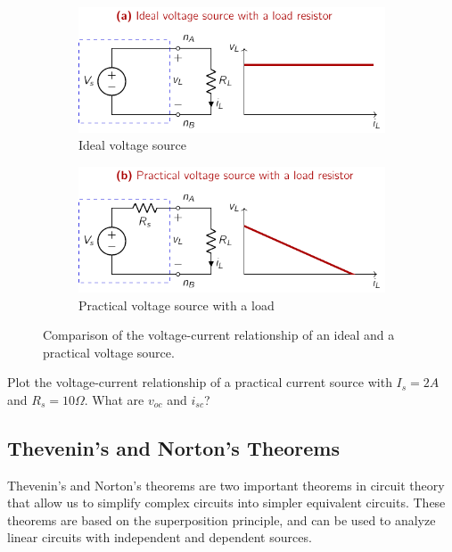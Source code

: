 \begin{figure}[t]
    \centering
    \begin{subfigure}{0.48\textwidth}
        \centering
        \includegraphics[width=\textwidth]{figure/fig02-04a.pdf}
        \caption{Ideal voltage source}
        \label{fig:02-04a}
    \end{subfigure}
    \hfill
    \begin{subfigure}{0.48\textwidth}
        \centering
        \includegraphics[width=\textwidth]{figure/fig02-04b.pdf}
        \caption{Practical voltage source with a load}
        \label{fig:02-04b}
    \end{subfigure}
    \caption{Comparison of the voltage-current relationship of an ideal and a practical voltage source.}
    \label{fig:02-04}
\end{figure}

\begin{boxedstuff}
    \begin{problem}
        Plot the voltage-current relationship of a practical current source with $I_s = 2A$ and $R_s = 10\Omega$. What are $v_{oc}$ and $i_{sc}$?
    \end{problem}
\end{boxedstuff}

\subsection{Thevenin's and Norton's Theorems}
Thevenin's and Norton's theorems are two important theorems in circuit theory that allow us to simplify complex circuits into simpler equivalent circuits. These theorems are based on the superposition principle, and can be used to analyze linear circuits with independent and dependent sources.

